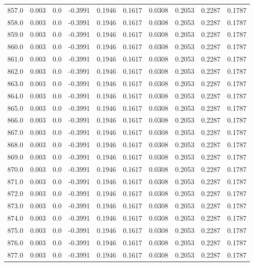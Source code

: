 \begin{longtable}{lrrrrrrrrr}
857.0 & 0.003 & 0.0 & -0.3991 & 0.1946 & 0.1617 & 0.0308 & 0.2053 & 0.2287 & 0.1787 \\
858.0 & 0.003 & 0.0 & -0.3991 & 0.1946 & 0.1617 & 0.0308 & 0.2053 & 0.2287 & 0.1787 \\
859.0 & 0.003 & 0.0 & -0.3991 & 0.1946 & 0.1617 & 0.0308 & 0.2053 & 0.2287 & 0.1787 \\
860.0 & 0.003 & 0.0 & -0.3991 & 0.1946 & 0.1617 & 0.0308 & 0.2053 & 0.2287 & 0.1787 \\
861.0 & 0.003 & 0.0 & -0.3991 & 0.1946 & 0.1617 & 0.0308 & 0.2053 & 0.2287 & 0.1787 \\
862.0 & 0.003 & 0.0 & -0.3991 & 0.1946 & 0.1617 & 0.0308 & 0.2053 & 0.2287 & 0.1787 \\
863.0 & 0.003 & 0.0 & -0.3991 & 0.1946 & 0.1617 & 0.0308 & 0.2053 & 0.2287 & 0.1787 \\
864.0 & 0.003 & 0.0 & -0.3991 & 0.1946 & 0.1617 & 0.0308 & 0.2053 & 0.2287 & 0.1787 \\
865.0 & 0.003 & 0.0 & -0.3991 & 0.1946 & 0.1617 & 0.0308 & 0.2053 & 0.2287 & 0.1787 \\
866.0 & 0.003 & 0.0 & -0.3991 & 0.1946 & 0.1617 & 0.0308 & 0.2053 & 0.2287 & 0.1787 \\
867.0 & 0.003 & 0.0 & -0.3991 & 0.1946 & 0.1617 & 0.0308 & 0.2053 & 0.2287 & 0.1787 \\
868.0 & 0.003 & 0.0 & -0.3991 & 0.1946 & 0.1617 & 0.0308 & 0.2053 & 0.2287 & 0.1787 \\
869.0 & 0.003 & 0.0 & -0.3991 & 0.1946 & 0.1617 & 0.0308 & 0.2053 & 0.2287 & 0.1787 \\
870.0 & 0.003 & 0.0 & -0.3991 & 0.1946 & 0.1617 & 0.0308 & 0.2053 & 0.2287 & 0.1787 \\
871.0 & 0.003 & 0.0 & -0.3991 & 0.1946 & 0.1617 & 0.0308 & 0.2053 & 0.2287 & 0.1787 \\
872.0 & 0.003 & 0.0 & -0.3991 & 0.1946 & 0.1617 & 0.0308 & 0.2053 & 0.2287 & 0.1787 \\
873.0 & 0.003 & 0.0 & -0.3991 & 0.1946 & 0.1617 & 0.0308 & 0.2053 & 0.2287 & 0.1787 \\
874.0 & 0.003 & 0.0 & -0.3991 & 0.1946 & 0.1617 & 0.0308 & 0.2053 & 0.2287 & 0.1787 \\
875.0 & 0.003 & 0.0 & -0.3991 & 0.1946 & 0.1617 & 0.0308 & 0.2053 & 0.2287 & 0.1787 \\
876.0 & 0.003 & 0.0 & -0.3991 & 0.1946 & 0.1617 & 0.0308 & 0.2053 & 0.2287 & 0.1787 \\
877.0 & 0.003 & 0.0 & -0.3991 & 0.1946 & 0.1617 & 0.0308 & 0.2053 & 0.2287 & 0.1787 \\

\end{longtable}
